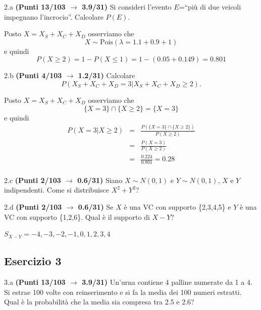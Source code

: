\documentclass[
  11pt,
]{book}
\theoremstyle{mytheoremstyle}
\theoremstyle{mydefstyle}
\newenvironment{sol}
  {
  \begin{tcolorbox}[enhanced,breakable,arc=0.1mm,boxrule=1pt,colback=white,colframe=iblue,
  title=\bf \fontfamily{lmss}\selectfont \hspace{.5 cm} Soluzione,drop fuzzy shadow]

}{
\end{tcolorbox}
  }
\begin{document}
2.a \textbf{(Punti 13/103 \(\rightarrow\) 3.9/31)} Si consideri l'evento \(E\)=``più di due veicoli
impegnano l'incrocio''. Calcolare \(P(E)\).

\begin{sol}
Posto \(X=X_S+X_C+X_D\) osserviamo che
\[X\sim\text{Pois}(\lambda=1.1+0.9+1)\]
e quindi
\[P(X\ge 2)=1-P(X\le 1)=1-(0.05+0.149)=0.801\]

\end{sol}

2.b \textbf{(Punti 4/103 \(\rightarrow\) 1.2/31)} Calcolare
\[
P(X_S+X_C+X_D=3|X_S+X_C+X_D\ge 2).
\]

\begin{sol}
Posto \(X=X_S+X_C+X_D\) osserviamo che
\[\{X=3\}\cap\{X \ge 2\}=\{X=3\}\]
e quindi
\begin{eqnarray*}
  P(X=3|X\ge 2) &=&  \frac{P(\{X=3\}\cap\{X \ge 2\})}{P(X \ge 2)}\\
  &=&\frac{P(X=3)}{P(X \ge 2)}\\
  &=&\frac{0.224}{0.801}=0.28\\
\end{eqnarray*}

\end{sol}

2.c \textbf{(Punti 2/103 \(\rightarrow\) 0.6/31)} Siano \(X\sim N(0,1)\) e \(Y\sim N(0,1)\), \(X\) e \(Y\) indipendenti.
Come si distribuisce \(X^2+Y^2\)?

2.d \textbf{(Punti 2/103 \(\rightarrow\) 0.6/31)} Se \(X\) è una VC con supporto \{2,3,4,5\} e \(Y\) è una VC con supporto
\{1,2,6\}.
Qual è il supporto di \(X-Y\)?

\begin{sol}
\(S_{X-Y}=-4, -3, -2, -1, 0, 1, 2, 3, 4\)

\end{sol}

\subsection{Esercizio 3}\label{esercizio-3-16}

3.a \textbf{(Punti 13/103 \(\rightarrow\) 3.9/31)} Un'urna contiene 4 palline numerate da 1 a 4.
Si estrae 100 volte con reinserimento e si fa la media dei 100 numeri
estratti. Qual è la probabilità che la media sia compresa tra 2.5 e 2.6?
\end{document}
